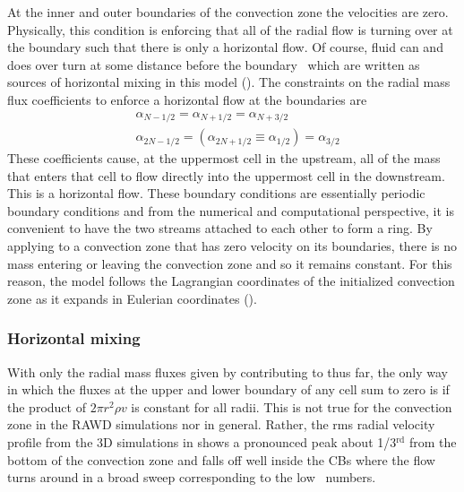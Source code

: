 \documentclass[fleqn,usenatbib]{mnras}
\newcommand{\ppmstar}{\code{PPMstar}}
\begin{document}
At the inner and outer boundaries of the convection zone the velocities are
zero. Physically, this condition is enforcing that all of the radial flow is
turning over at the boundary such that there is only a horizontal flow. Of
course, fluid can and does over turn at some distance before the
boundary~\citep{Jones:2017kc} which are written as sources of horizontal mixing
in this model (). The constraints on the radial mass flux
coefficients to enforce a horizontal flow at the boundaries are
%
\begin{subequations}
\begin{align*}
  &\alpha_{N-1/2} = \alpha_{N+1/2} = \alpha_{N+3/2} \\
  &\alpha_{2N-1/2} = \left( \alpha_{2N+1/2} \equiv \alpha_{1/2} \right) = \alpha_{3/2}
\end{align*}
\end{subequations}
%
These coefficients cause, at the uppermost cell in the upstream, all of the mass
that enters that cell to flow directly into the uppermost cell in the
downstream. This is a horizontal flow. These boundary conditions are essentially
periodic boundary conditions and from the numerical and computational
perspective, it is convenient to have the two streams attached to each other to
form a ring. By applying  to a convection zone that has zero
velocity on its boundaries, there is no mass entering or leaving the convection
zone and so it remains constant. For this reason, the model follows the
Lagrangian coordinates of the \ppmstar{} initialized convection zone as it
expands in Eulerian coordinates ().

\subsubsection{Horizontal mixing}
\label{sec:horizontalMix}

With only the radial mass fluxes given by  contributing to
 thus far, the only way in which the fluxes at the upper and lower
boundary of any cell sum to zero is if the product of $2 \pi r^{2} \rho v$ is
constant for all radii. This is not true for the convection zone in the RAWD
simulations nor in general. Rather, the rms radial velocity
profile from the 3D simulations in  shows a pronounced peak about
1/3$^\mathrm{rd}$ from the bottom of the convection zone and falls off well
inside the CBs where the flow turns around in a broad sweep corresponding to
the low \mach~numbers.
\end{document}
